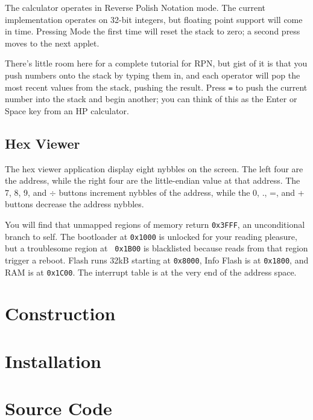 \documentclass{article}
\begin{document}
\begin{multicols}{2}
The calculator operates in Reverse Polish Notation mode.  The current
implementation operates on 32-bit integers, but floating point support
will come in time.  Pressing Mode the first time will reset the stack
to zero; a second press moves to the next applet.

There's little room here for a complete tutorial for RPN, but gist of
it is that you push numbers onto the stack by typing them in, and each
operator will pop the most recent values from the stack, pushing the
result.  Press {\tt =} to push the current number into the stack and
begin another; you can think of this as the Enter or Space key from an
HP calculator.

\subsection*{Hex Viewer}

The hex viewer application display eight nybbles on the screen.  The
left four are the address, while the right four are the little-endian
value at that address.  The 7, 8, 9, and $\div$ buttons increment
nybbles of the address, while the 0, ., =, and + buttons decrease the
address nybbles.

You will find that unmapped regions of memory return {\tt 0x3FFF}, an
unconditional branch to self.  The bootloader at {\tt 0x1000} is
unlocked for your reading pleasure, but a troublesome region at {\tt
  0x1B00} is blacklisted because reads from that region trigger a
reboot.  Flash runs 32kB starting at {\tt 0x8000}, Info Flash is at
{\tt 0x1800}, and RAM is at {\tt 0x1C00}.  The interrupt table is at
the very end of the address space.


\section{Construction}

\section{Installation}

\section{Source Code}



\end{multicols}
\end{document}
